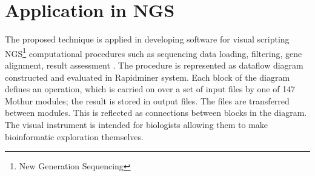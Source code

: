 \documentclass[conference]{IEEEtran}
\begin{document}









\section{Application in NGS}
\label{sec:ngs-appl}

The proposed technique is applied in developing software for visual scripting NGS\footnote{New Generation Sequencing} computational procedures such as sequencing data loading, filtering, gene alignment, result assessment \cite{bit2019}.  The procedure is represented as dataflow diagram constructed and evaluated in Rapidminer system.  Each block of the diagram defines an operation, which is carried on over a set of input files by one of 147 Mothur modules; the result is stored in output files.  The files are transferred between modules.  This is reflected as connections between blocks in the diagram.  The visual instrument is intended for biologists allowing them to make bioinformatic exploration themselves.
\end{document}
